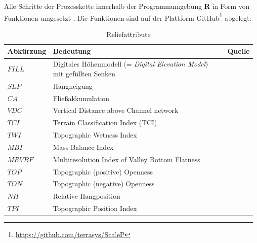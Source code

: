 Alle Schritte der Prozesskette innerhalb der Programmumgebung \textbf{R} in Form von Funktionen umgesetzt  \citep{R2018}. Die  Funktionen sind auf der Plattform GitHub\footnote{\url{https://github.com/terrasys/ScaleP}} abgelegt. 


\begin{table}[t]
	\centering
	\caption{Reliefattribute}\label{tab:terrainattributes}
	\begin{tabularx}{\textwidth}{l|X|X}
		\toprule
		\textbf{Abkürzung} & \textbf{Bedeutung} & \textbf{Quelle}\\
		\midrule
		$FILL$   & Digitales Höhenmodell  (= \textit{Digital Elevation Model}) mit gefüllten Senken &  \citep{PlanchonDarboux2001catena}\\\midrule
		$SLP$   & Hangneigung &  \citet{ZevenbergenThorne1987espl}\\\midrule
		$CA$   & Fließakkumulation &  \citet{Quinn-etal1991hp}\\\midrule
		$VDC$   & Vertical Distance above Channel network  &  \\\midrule
		$TCI$   & Terrain Classification Index (TCI) & \citet{Bock-etal2007saga}\\\midrule
		$TWI$   & Topographic Wetness Index &  \citet{BevenKirkby1979hsb}\\\midrule
		$MBI$   & Mass Balance Index &  \citet{Moeller-etal2008jpnss,Moeller-etal2012catena,MoellerVolk2015geoderma}\\\midrule
		$MRVBF$ & Multiresolution Index of Valley Bottom Flatness &  \citet{GallantDowling2003wrr}\\\midrule
		$TOP$   & Topographic (positive) Openness &  \citet{Yokoyama-etal2002pers}\\\midrule
	    $TON$   & Topographic (negative) Openness &  \citet{Yokoyama-etal2002pers}\\\midrule
		$NH$   & Relative Hangposition &  \citet{BoehnerSelige2006saga}\\\midrule
		$TPI$   & Topographic Position Index &  \citet{Guisan-etal1999pe}\\\bottomrule
	\end{tabularx}
\end{table}

